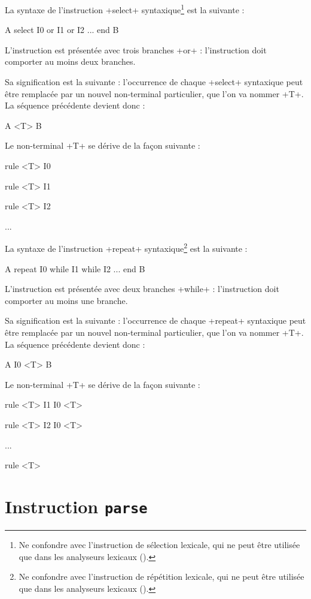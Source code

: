 
La syntaxe de l'instruction \ggs+select+ syntaxique\footnote{Ne confondre avec l'instruction de sélection lexicale, qui ne peut être utilisée que dans les analyseurs lexicaux ().} est la suivante :
\begin{galgas}
A
select
  I0
or
  I1
or
  I2
...
end
B
\end{galgas}

L'instruction est présentée avec trois branches \ggs+or+ : l'instruction doit comporter au moins deux branches.

Sa signification est la suivante : l'occurrence de chaque \ggs+select+ syntaxique peut être remplacée par un nouvel non-terminal particulier, que l'on va nommer \ggs+T+. La séquence précédente devient donc :
\begin{galgas}
A
<T>
B
\end{galgas}

Le non-terminal \ggs+T+ se dérive de la façon suivante :
\begin{galgas}
rule <T> { I0 }

rule <T> { I1 }

rule <T> { I2 }

...
\end{galgas}








La syntaxe de l'instruction \ggs+repeat+ syntaxique\footnote{Ne confondre avec l'instruction de répétition lexicale, qui ne peut être utilisée que dans les analyseurs lexicaux ().} est la suivante :
\begin{galgas}
A
repeat
  I0
while
  I1
while
  I2
...
end
B
\end{galgas}

L'instruction est présentée avec deux branches \ggs+while+ : l'instruction doit comporter au moins une branche.

Sa signification est la suivante : l'occurrence de chaque \ggs+repeat+ syntaxique peut être remplacée par un nouvel non-terminal particulier, que l'on va nommer \ggs+T+. La séquence précédente devient donc :
\begin{galgas}
A
I0
<T>
B
\end{galgas}

Le non-terminal \ggs+T+ se dérive de la façon suivante :
\begin{galgas}
rule <T> { I1 I0 <T> }

rule <T> { I2 I0 <T> }

...

rule <T> {  }
\end{galgas}







\section{Instruction \texttt{parse}}











